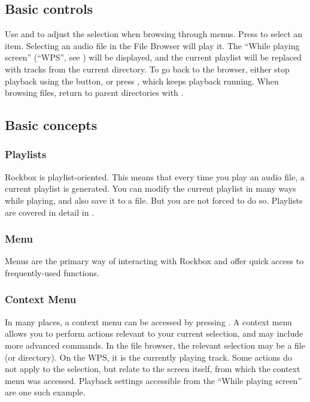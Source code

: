 \subsection{Basic controls}
Use \ActionStdNext{} and \ActionStdPrev{} to adjust the selection when browsing
through menus. 
Press \ActionStdOk{} to select an item. Selecting an audio file in the File Browser
will play it. The ``While playing screen'' (``WPS'', see ) will
be displayed, and the current playlist will be replaced with tracks from the current
directory. To go back to the browser, either stop playback using the
\ActionWpsStop{} button, or press \ActionWpsBrowse{}, which keeps playback
running.
When browsing files, return to parent directories with \ActionTreeParentDirectory.

\subsection{Basic concepts}
\subsubsection{Playlists}
Rockbox is playlist-oriented. This means that every time you play an audio file,
a current playlist is generated.
You can modify the current playlist in many ways while playing, and also save
it to a file. But you are not forced to do so.
Playlists are covered in detail in .

\subsubsection{Menu}
Menus are the primary way of interacting with Rockbox and offer quick access
to frequently-used functions.

\subsubsection{Context Menu}
In many places, a context menu can be accessed by pressing \ActionStdContext{}.
A context menu allows you to perform actions relevant to your current selection, and may
include more advanced commands.
In the file browser, the relevant selection may be a file (or directory).
On the WPS, it is the currently playing track. Some actions do not apply
to the selection, but relate to the screen itself, from which the context menu
was accessed. Playback settings accessible from the ``While playing screen'' are one such
example.

